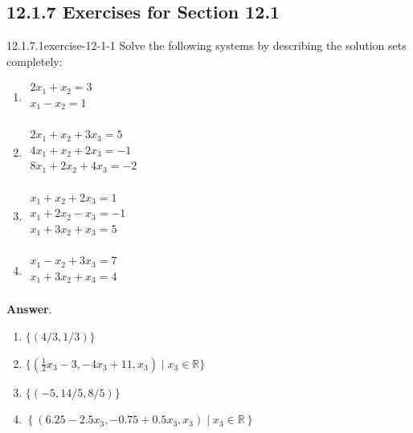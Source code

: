 \documentclass[twoside,10pt,]{book}
\numberwithin{equation}{section}
\begin{document}
\subsection*{12.1.7 Exercises for Section 12.1}
\begin{divisionsolution}{12.1.7.1}{}{exercise-12-1-1}%
\hypertarget{p-4377}{}%
Solve the following systems by describing the solution sets completely:\leavevmode%
\begin{multicols}{2}
\begin{enumerate}[label=(\alph*)]
\item\hypertarget{li-2000}{}\hypertarget{p-4378}{}%
\(\begin{array}{l}
2 x_1+x_2=3 \\
x_1-x_2=1 \\
\end{array}\)%
\item\hypertarget{li-2001}{}\hypertarget{p-4379}{}%
\(\begin{array}{l}
2 x_1+x_2+3 x_3=5 \\
4 x_1+x_2+2 x_3=-1 \\
8 x_1+2 x_2+4 x_3=-2 \\
\end{array}\)%
\item\hypertarget{li-2002}{}\hypertarget{p-4380}{}%
\(\begin{array}{l}
x_1+x_2+2 x_3=1 \\
x_1+2 x_2-x_3=-1 \\
x_1+3 x_2+x_3=5 \\
\end{array}\)%
\item\hypertarget{li-2003}{}\hypertarget{p-4381}{}%
\(\begin{array}{l}
x_1-x_2+3 x_3=7 \\
x_1+3 x_2+x_3=4 \\
\end{array}\)%
\end{enumerate}
\end{multicols}
%
\par\smallskip%
\noindent\textbf{Answer}.\quad%
\hypertarget{p-4382}{}%
\leavevmode%
\begin{enumerate}[label=(\alph*)]
\item\hypertarget{li-2004}{}\hypertarget{p-4383}{}%
\(\{(4/3, 1/3)\}\)%
\item\hypertarget{li-2005}{}\hypertarget{p-4384}{}%
\(\{(\frac{1}{2}x_3-3, -4 x_3 +11,x_3) \mid x_3 \in \mathbb{R}\} \)%
\item\hypertarget{li-2006}{}\hypertarget{p-4385}{}%
\(\{(-5, 14/5, 8/5)\}\)%
\item\hypertarget{li-2007}{}\hypertarget{p-4386}{}%
\(\left\{\left(6.25 - 2.5x_3, -0.75 + 0.5x_3 , x_3\right) \mid x_3 \in  \mathbb{R}\right\}\)%
\end{enumerate}
%
\end{divisionsolution}%
\end{document}
